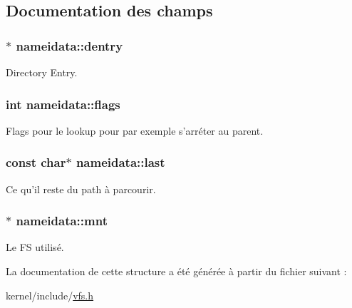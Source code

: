 \subsection{Documentation des champs}
\hypertarget{structnameidata_a19b1de01d7a6f689707fa7079cb54d7c}{
\subsubsection[{dentry}]{$\ast$ nameidata\-::dentry}}\label{structnameidata_a19b1de01d7a6f689707fa7079cb54d7c}
Directory Entry. \hypertarget{structnameidata_a9064ec2b4dd712691e3c7442e48ce798}{
\subsubsection[{flags}]{\setlength{\rightskip}{0pt plus 5cm}int nameidata\-::flags}}\label{structnameidata_a9064ec2b4dd712691e3c7442e48ce798}
Flags pour le lookup pour par exemple s'arréter au parent. \hypertarget{structnameidata_a4a11e098a53839c36c2a0a4e732f8037}{
\subsubsection[{last}]{\setlength{\rightskip}{0pt plus 5cm}const char$\ast$ nameidata\-::last}}\label{structnameidata_a4a11e098a53839c36c2a0a4e732f8037}
Ce qu'il reste du path à parcourir. \hypertarget{structnameidata_a5488ed23ef4b37b431921f71b15e1f19}{
\subsubsection[{mnt}]{$\ast$ nameidata\-::mnt}}\label{structnameidata_a5488ed23ef4b37b431921f71b15e1f19}
Le F\-S utilisé. 

La documentation de cette structure a été générée à partir du fichier suivant \-:\begin{DoxyCompactItemize}
\item 
kernel/include/\hyperlink{vfs_8h}{vfs.\-h}\end{DoxyCompactItemize}

